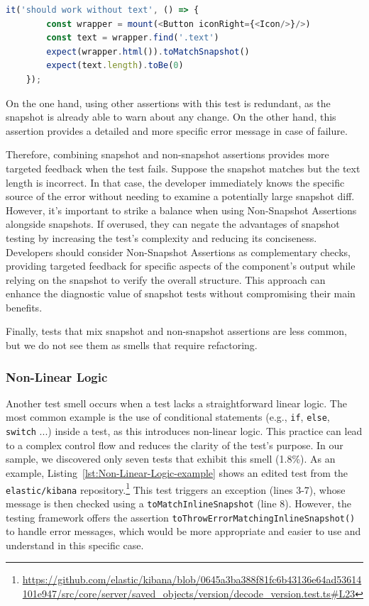 \documentclass[
	msc, %
	english %
]{../ppgccufmg}
\begin{document}
            \begin{lstlisting}[language=javascript, caption=  Non-snapshot assertions in \texttt{geist-org/react}, label=lst:Non-Snapshot-Assertions-example]
    it('should work without text', () => {
        const wrapper = mount(<Button iconRight={<Icon/>}/>)
        const text = wrapper.find('.text')
        expect(wrapper.html()).toMatchSnapshot()
        expect(text.length).toBe(0)
    });
            \end{lstlisting}

            On the one hand, using other assertions with this test is redundant, as the snapshot is already able to warn about any change. On the other hand, this assertion provides a detailed and more specific error message in case of failure.
            
            Therefore, combining snapshot and non-snapshot assertions provides more targeted feedback when the test fails. Suppose the snapshot matches but the text length is incorrect. In that case, the developer immediately knows the specific source of the error without needing to examine a potentially large snapshot diff. However, it's important to strike a balance when using Non-Snapshot Assertions alongside snapshots. If overused, they can negate the advantages of snapshot testing by increasing the test's complexity and reducing its conciseness. Developers should consider Non-Snapshot Assertions as complementary checks, providing targeted feedback for specific aspects of the component's output while relying on the snapshot to verify the overall structure. This approach can enhance the diagnostic value of snapshot tests without compromising their main benefits.

            Finally, tests that mix snapshot and non-snapshot assertions are less common, but we do not see them as smells that require refactoring.
            
            \subsubsection{Non-Linear Logic}

            Another test smell occurs when a test lacks a straightforward linear logic. The most common example is the use of conditional statements (e.g., \texttt{if}, \texttt{else}, \texttt{switch} ...) inside a test, as this introduces non-linear logic. This practice can lead to a complex control flow and reduces the clarity of the test's purpose. In our sample, we discovered only seven tests that exhibit this smell (1.8\%).
            As an example, Listing~\ref{lst:Non-Linear-Logic-example} shows an edited test from the \texttt{elastic/kibana} repository.\footnote{\url{https://github.com/elastic/kibana/blob/0645a3ba388f81fc6b43136e64ad53614101e947/src/core/server/saved_objects/version/decode_version.test.ts\#L23}} This test triggers an exception (lines 3-7), whose message is then checked using a \texttt{toMatchInlineSnapshot} (line 8). However, the testing framework offers the assertion \texttt{toThrowErrorMatchingInlineSnapshot()} to handle error messages, which would be more appropriate and easier to use and understand in this specific case.
\end{document}
